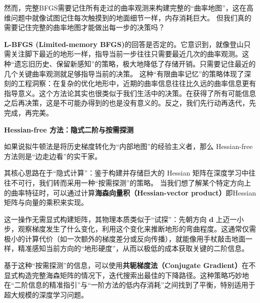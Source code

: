 然而，完整BFGS需要记住所有走过的曲率观测来构建完整的``曲率地图''，这在高维问题中就像试图记住每次触摸到的地面细节一样，内存消耗巨大。
但我们真的需要记住完整的曲率地图才能做出每一步的决策吗？

\textbf{L-BFGS (Limited-memory BFGS)}的回答是否定的。它意识到，就像登山只需关注脚下最近的地形一样，指导当前一步往往只需要最近几次的曲率观测。这种“遗忘旧历史、保留新感知”的策略，极大地降低了存储开销。只需要记住最近的几个关键曲率观测就足够指导当前的决策。
这种``有限曲率记忆''的策略体现了深刻的工程洞察：在复杂的优化地形中，近期的曲率信息往往比久远的曲率信息更有指导意义。这个方法论其实也很类似于我们生活中的决策。在获得了所有可能信息之后再决策，这是不可能办得到的也是没有意义的。反之，我们先行动再迭代，先完成，再完美。

\textbf{Hessian-free 方法：隐式二阶与按需探测}

如果说拟牛顿法是将历史梯度转化为“内部地图”的经验主义者，那么 Hessian-free 方法则是“边走边看”的实干家。

其核心思路在于“隐式计算”：鉴于构建并存储巨大的 Hessian 矩阵在深度学习中往往不可行，我们转而采用一种“按需探测”的策略。 当我们想了解某个特定方向上的曲率特征时，可以通过计算\textbf{海森向量积（Hessian-vector product）}即Hessian矩阵与向量的乘积来实现。

这一操作无需显式构建矩阵，其物理本质类似于``试探''：先朝方向 $\mathbf{d}$ 上迈一小步，观察梯度发生了什么变化，利用这个变化来推断地形的弯曲程度。这通常仅需极小的计算代价（如一次额外的梯度差分或反向传播），就能像用手杖敲击地面一样，精准感知当前方向的“地形硬度”，从而以极低的成本获取关键的二阶信息。

基于这种``按需探测''的信息，可以使用\textbf{共轭梯度法（Conjugate Gradient）}在不显式构造完整海森矩阵的情况下，迭代搜索出最佳的下降路径。这种策略巧妙地在“二阶信息的精准指引”与“一阶方法的低内存消耗”之间找到了平衡，特别适用于超大规模的深度学习问题。


%
%
%
%

